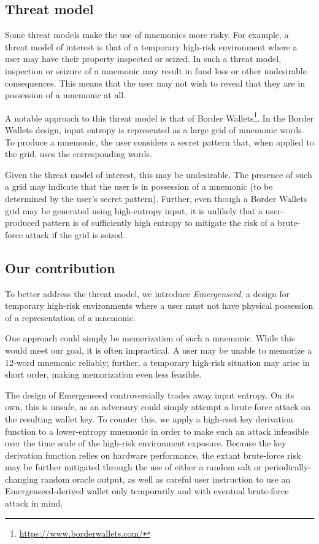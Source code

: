 \documentclass{article}
\begin{document}
\subsection{Threat model}

Some threat models make the use of mnemonics more risky.
For example, a threat model of interest is that of a temporary high-risk environment where a user may have their property inspected or seized.
In such a threat model, inspection or seizure of a mnemonic may result in fund loss or other undesirable consequences.
This means that the user may not wish to reveal that they are in possession of a mnemonic at all.

A notable approach to this threat model is that of Border Wallets\footnote{\url{https://www.borderwallets.com/}}.
In the Border Wallets design, input entropy is represented as a large grid of mnemonic words.
To produce a mnemonic, the user considers a secret pattern that, when applied to the grid, uses the corresponding words.

Given the threat model of interest, this may be undesirable.
The presence of such a grid may indicate that the user is in possession of a mnemonic (to be determined by the user's secret pattern).
Further, even though a Border Wallets grid may be generated using high-entropy input, it is unlikely that a user-produced pattern is of sufficiently high entropy to mitigate the risk of a brute-force attack if the grid is seized.


\subsection{Our contribution}

To better address the threat model, we introduce \textit{Emergenseed}, a design for temporary high-risk environments where a user must not have physical possession of a representation of a mnemonic.

One approach could simply be memorization of such a mnemonic.
While this would meet our goal, it is often impractical.
A user may be unable to memorize a 12-word mnemonic reliably; further, a temporary high-risk situation may arise in short order, making memorization even less feasible.

The design of Emergenseed controversially trades away input entropy.
On its own, this is unsafe, as an adversary could simply attempt a brute-force attack on the resulting wallet key.
To counter this, we apply a high-cost key derivation function to a lower-entropy mnemonic in order to make such an attack infeasible over the time scale of the high-risk environment exposure.
Because the key derivation function relies on hardware performance, the extant brute-force risk may be further mitigated through the use of either a random salt or periodically-changing random oracle output, as well as careful user instruction to use an Emergenseed-derived wallet only temporarily and with eventual brute-force attack in mind.
\end{document}
